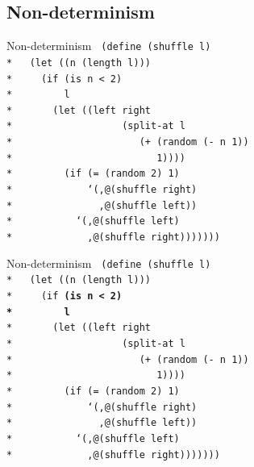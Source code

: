 \documentclass{beamer}
\begin{document}
\subsection{Non-determinism}

\begin{frame}{Non-determinism}
  \texttt{
    (define (shuffle l)\\*
    \ \ (let ((n (length l)))\\*
    \ \ \ \ (if (is n < 2)\\*
    \ \ \ \ \ \ \ \ l\\*
    \ \ \ \ \ \ (let ((left right\\*
    \ \ \ \ \ \ \ \ \ \ \ \ \ \ \ \ \ \ (split-at l\\*
    \ \ \ \ \ \ \ \ \ \ \ \ \ \ \ \ \ \ \ \ \ (+ (random (- n 1))\\*
    \ \ \ \ \ \ \ \ \ \ \ \ \ \ \ \ \ \ \ \ \ \ \ \ 1))))\\*
    \ \ \ \ \ \ \ \ (if (= (random 2) 1)\\*
    \ \ \ \ \ \ \ \ \ \ \ \ `(,@(shuffle right)\\*
    \ \ \ \ \ \ \ \ \ \ \ \ \ \ ,@(shuffle left))\\*
    \ \ \ \ \ \ \ \ \ \ `(,@(shuffle left)\\*
    \ \ \ \ \ \ \ \ \ \ \ \ ,@(shuffle right)))))))
    }
\end{frame}

\begin{frame}{Non-determinism}
  \texttt{
    (define (shuffle l)\\*
    \ \ (let ((n (length l)))\\*
    \ \ \ \ (if \textbf{(is n < 2)\\*
    \ \ \ \ \ \ \ \ l}\\*
    \ \ \ \ \ \ (let ((left right\\*
    \ \ \ \ \ \ \ \ \ \ \ \ \ \ \ \ \ \ (split-at l\\*
    \ \ \ \ \ \ \ \ \ \ \ \ \ \ \ \ \ \ \ \ \ (+ (random (- n 1))\\*
    \ \ \ \ \ \ \ \ \ \ \ \ \ \ \ \ \ \ \ \ \ \ \ \ 1))))\\*
    \ \ \ \ \ \ \ \ (if (= (random 2) 1)\\*
    \ \ \ \ \ \ \ \ \ \ \ \ `(,@(shuffle right)\\*
    \ \ \ \ \ \ \ \ \ \ \ \ \ \ ,@(shuffle left))\\*
    \ \ \ \ \ \ \ \ \ \ `(,@(shuffle left)\\*
    \ \ \ \ \ \ \ \ \ \ \ \ ,@(shuffle right)))))))
    }
\end{frame}
\end{document}
